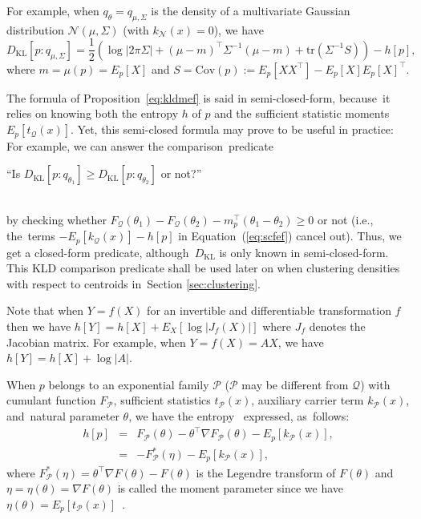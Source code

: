 \documentclass[entropy,article,accept,oneauthor,pdftex,entropy]{Definitions/mdpi}
\def\calQ{\mathcal{Q}}
\def\KL{\mathrm{KL}}
\def\tr{\mathrm{tr}}
\def\calN{\mathcal{N}}
\def\calQ{\mathcal{Q}}
\def\calP{\mathcal{P}}
\begin{document}
\begin{paracol}{2}
\begin{Example}
For example, when $q_\theta=q_{\mu,\Sigma}$ is the density of a multivariate Gaussian distribution $\mathcal{N}(\mu,\Sigma)$ (with $k_\calN(x)=0$), we have
\begin{equation}
D_\KL[p:q_{\mu,\Sigma}]=\frac{1}{2}\left(\log |2\pi\Sigma|+
(\mu-m)^\top \Sigma^{-1}(\mu-m) + \tr(\Sigma^{-1}S) \right)-h[p],
\end{equation}
where $m=\mu(p)=E_p[X]$ and  $S=\mathrm{Cov}(p):=E_p\left[XX^\top\right]-E_p[X]E_p[X]^\top$.  
\end{Example}

The formula of Proposition~\ref{eq:kldmef} is said in semi-closed-form, because~it relies on knowing both the entropy $h$ of $p$ and the  sufficient statistic moments $E_p[t_\calQ(x)]$. 
Yet, this semi-closed formula may prove to be useful in practice:
For example, we can answer the comparison~predicate\\
\centerline{``Is $D_\KL[p:q_{\theta_1}]\geq D_\KL[p:q_{\theta_2}]$ or not?''} \\
by checking whether
$F_\calQ(\theta_1)-F_\calQ(\theta_2)-m_p^\top(\theta_1-\theta_2)\geq 0$ or not (i.e., the~terms $-E_p[k_\calQ(x)]-h[p]$ in Equation~(\ref{eq:scfef}) cancel out).
Thus, we get a closed-form predicate, although~$D_\KL$ is only known in semi-closed-form.
This KLD comparison predicate shall be used later on when clustering densities with respect to centroids in~Section \ref{sec:clustering}. 

\begin{Remark}
Note that when $Y=f(X)$ for an invertible and differentiable transformation $f$ then we have $h[Y]=h[X]+E_X[\log |J_f(X)|]$ where $J_f$ denotes the Jacobian matrix.
For example, when $Y=f(X)=AX$, we have $h[Y]=h[X]+\log |A|$.
\end{Remark}

When $p$ belongs to an exponential family $\calP$  ($\calP$ may be different from $\calQ$) with cumulant function $F_\calP$, sufficient statistics $t_\calP(x)$, 
auxiliary carrier term $k_\calP(x)$, and~natural parameter $\theta$, 
  we have the entropy~\cite{crossentropyEF-2010} expressed, as~follows:
\begin{eqnarray}
h[p] &=& F_\calP(\theta)-\theta^\top\nabla F_\calP(\theta)-E_p[k_\calP(x)],\\
&=& -F^*_\calP(\eta)-E_p[k_\calP(x)],
\end{eqnarray}
where $F^*_\calP(\eta)=\theta^\top\nabla F(\theta)-F(\theta)$ is the Legendre transform of $F(\theta)$ and $\eta=\eta(\theta)=\nabla F(\theta)$ is called 
the moment parameter since we have $\eta(\theta)=E_p[t_\calP(x)]$~\cite{EF-2009,EF-2014}.


\end{paracol}
\end{document}
